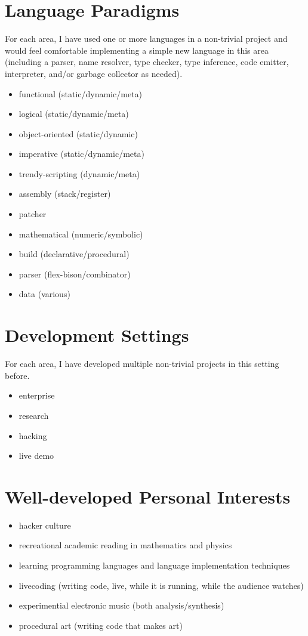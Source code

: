 \documentclass[12pt]{article}
\begin{document}
\section*{Language Paradigms}
For each area, I have used one or more languages in a non-trivial project and
would feel comfortable implementing a simple new language in this area
(including a parser, name resolver, type checker, type inference, code
emitter, interpreter, and/or garbage collector as needed).

\begin{itemize}
  \item functional (static/dynamic/meta) 
  \item logical (static/dynamic/meta)
  \item object-oriented (static/dynamic)
  \item imperative (static/dynamic/meta)
  \item trendy-scripting (dynamic/meta)
  \item assembly (stack/register)
  \item patcher
  \item mathematical (numeric/symbolic)
  \item build (declarative/procedural)
  \item parser (flex-bison/combinator)
  \item data (various)
\end{itemize}

\section*{Development Settings}
For each area, I have developed multiple non-trivial projects in this setting before.
\begin{itemize}
  \item enterprise
  \item research
  \item hacking
  \item live demo
\end{itemize}

\newpage
\section*{Well-developed Personal Interests}
\begin{itemize}
  \item hacker culture
  \item recreational academic reading in mathematics and physics 
  \item learning programming languages and language implementation techniques
  \item livecoding (writing code, live, while it is running, while the audience
watches)
  \item experimential electronic music (both analysis/synthesis)
  \item procedural art (writing code that makes art)
\end{itemize}
\end{document}
